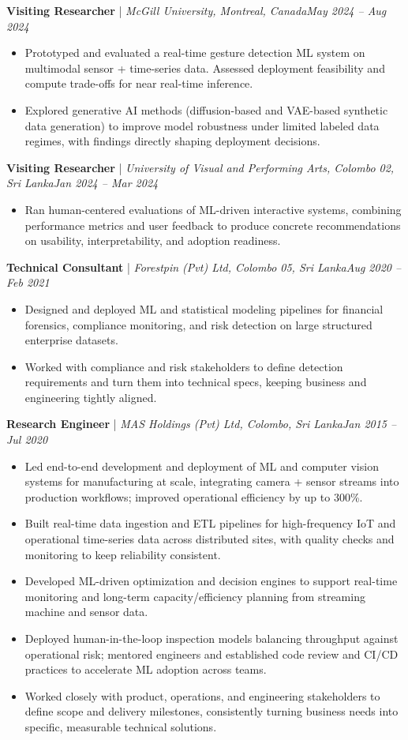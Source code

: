 \documentclass[11pt]{article}
\newenvironment{cvrole}[5]{%
  \par\noindent\textbf{\large #1} | \textit{\small #2, #3}\hfill \textit{\small #4 -- #5}\par
  \begin{itemize}[leftmargin=2em, itemsep=-0.3em, topsep=-0.5em]%
}{%
  \end{itemize}\par\noindent\mbox{}\par\vspace{0.1em}%
}
\begin{document}
\newpage
\begin{cvrole}{Visiting Researcher}{McGill University}{Montreal, Canada}{May 2024}{Aug 2024}
    \item Prototyped and evaluated a real-time gesture detection ML system on multimodal sensor + time-series data. Assessed deployment feasibility and compute trade-offs for near real-time inference.
    \item Explored generative AI methods (diffusion-based and VAE-based synthetic data generation) to improve model robustness under limited labeled data regimes, with findings directly shaping deployment decisions.
\end{cvrole}

\begin{cvrole}{Visiting Researcher}{University of Visual and Performing Arts}{Colombo 02, Sri Lanka}{Jan 2024}{Mar 2024}
    \item Ran human-centered evaluations of ML-driven interactive systems, combining performance metrics and user feedback to produce concrete recommendations on usability, interpretability, and adoption readiness.
\end{cvrole}

\begin{cvrole}{Technical Consultant}{Forestpin (Pvt) Ltd}{Colombo 05, Sri Lanka}{Aug 2020}{Feb 2021}
    \item Designed and deployed ML and statistical modeling pipelines for financial forensics, compliance monitoring, and risk detection on large structured enterprise datasets.
    \item Worked with compliance and risk stakeholders to define detection requirements and turn them into technical specs, keeping business and engineering tightly aligned.
\end{cvrole}

\begin{cvrole}{Research Engineer}{MAS Holdings (Pvt) Ltd}{Colombo, Sri Lanka}{Jan 2015}{Jul 2020}
    \item Led end-to-end development and deployment of ML and computer vision systems for manufacturing at scale, integrating camera + sensor streams into production workflows; improved operational efficiency by up to 300\%.
    \item Built real-time data ingestion and ETL pipelines for high-frequency IoT and operational time-series data across distributed sites, with quality checks and monitoring to keep reliability consistent.
    \item Developed ML-driven optimization and decision engines to support real-time monitoring and long-term capacity/efficiency planning from streaming machine and sensor data.
    \item Deployed human-in-the-loop inspection models balancing throughput against operational risk; mentored engineers and established code review and CI/CD practices to accelerate ML adoption across teams.
    \item Worked closely with product, operations, and engineering stakeholders to define scope and delivery milestones, consistently turning business needs into specific, measurable technical solutions.
\end{cvrole}
\end{document}
